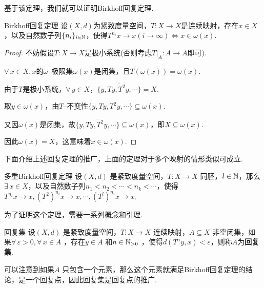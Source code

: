 基于该定理，我们就可以证明Birkhoff回复定理.
\begin{theorem*}{Birkhoff回复定理}
    设$(X,d)$为紧致度量空间，$T:X\to X$是连续映射，存在$x\in X$，以及自然数子列$\{n_i\}_{i\in\mathbb{N}}$，使得$T^{n_i}x\to x(i\to\infty)\Leftrightarrow x\in \omega(x)$.
\end{theorem*}
\begin{proof}
    不妨假设$T:X\to X$是极小系统(否则考虑$T|_A:A\to A$即可).\par
    $\forall\, x\in X,x$的$\omega$--极限集$\omega(x)$是闭集，且$T \left(\omega(x)\right)=\omega(x)$.\par
    由于$T$是极小系统，$\forall\, y\in X$，$\overline{\{y,Ty,T^2y,\cdots\}}=X$.\par
    取$y\in\omega(x)$，由$T$--不变性$\{y,Ty,T^2y,\cdots\}\subseteq \omega(x)$.\par
    又因$\omega(x)$是闭集，故$\overline{\{y,Ty,T^2y,\cdots\}}\subseteq\omega(x)$，即$X\subseteq\omega(x)$.\par
    因此$\omega(x)=X$，这意味着$x\in\omega(x)$.
\end{proof}

下面介绍上述回复定理的推广，上面的定理对于多个映射的情形类似可成立.\par
\begin{theorem}{多重Birkhoff回复定理}
    设$(X,d)$ 是紧致度量空间，$T:X\to X$ 同胚，$l\in\mathbb{N}$，那么$\exists\, x\in X$，以及自然数子列$n_1<n_2<\cdots<n_k<\cdots$，使得$T^{n_i}x\to x,\left(T^2\right)^{n_i}x\to x,\cdots,\left(T^l\right)^{n_i}x\to x$.
\end{theorem}

为了证明这个定理，需要一系列概念和引理.\par
\begin{definition}{回复集}
    设$(X,d)$ 是紧致度量空间，$T:X\to X$ 连续映射，$A\subseteq X$ 非空闭集，如果$\forall\,\varepsilon>0,\forall\, x\in A$ ，存在$y\in A$ 和$n\in\mathbb{N}_{>0}$ ，使得$d \left(T^ny,x\right)<\varepsilon$，则称$A$为\textbf{回复集}.
\end{definition}
可以注意到如果$A$ 只包含一个元素，那么这个元素就满足Birkhoff回复定理的结论，是一个回复点，因此回复集是回复点的推广.\par

